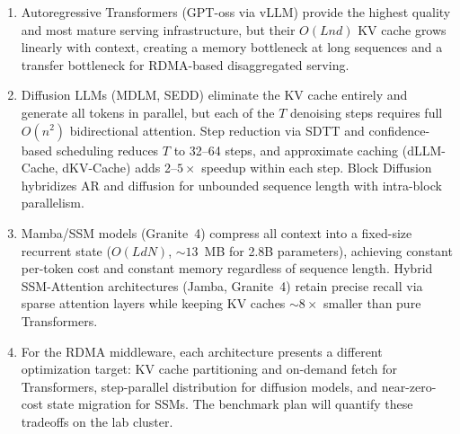\documentclass[11pt,letterpaper]{article}
\begin{document}
\begin{enumerate}[noitemsep]
    \item Autoregressive Transformers (GPT-oss via vLLM) provide the highest quality and most mature serving infrastructure, but their $O(Lnd)$ KV cache grows linearly with context, creating a memory bottleneck at long sequences and a transfer bottleneck for RDMA-based disaggregated serving.

    \item Diffusion LLMs (MDLM, SEDD) eliminate the KV cache entirely and generate all tokens in parallel, but each of the $T$ denoising steps requires full $O(n^2)$ bidirectional attention. Step reduction via SDTT and confidence-based scheduling reduces $T$ to 32--64 steps, and approximate caching (dLLM-Cache, dKV-Cache) adds 2--$5\times$ speedup within each step. Block Diffusion hybridizes AR and diffusion for unbounded sequence length with intra-block parallelism.

    \item Mamba/SSM models (Granite~4) compress all context into a fixed-size recurrent state ($O(LdN)$, ${\sim}13$~MB for 2.8B parameters), achieving constant per-token cost and constant memory regardless of sequence length. Hybrid SSM-Attention architectures (Jamba, Granite~4) retain precise recall via sparse attention layers while keeping KV caches ${\sim}8\times$ smaller than pure Transformers.

    \item For the RDMA middleware, each architecture presents a different optimization target: KV cache partitioning and on-demand fetch for Transformers, step-parallel distribution for diffusion models, and near-zero-cost state migration for SSMs. The benchmark plan will quantify these tradeoffs on the lab cluster.
\end{enumerate}



\end{document}
